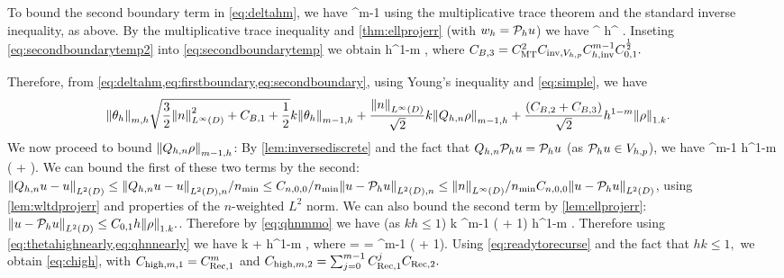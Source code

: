 To bound the second boundary term in \cref{eq:deltahm}, we have
\beq\label{eq:secondboundarytemp}
 \leq \CMT \CinvVhp \Chinv^{m-1}\NLtGI{\rho}
\eeq
using the multiplicative trace theorem and the standard inverse inequality, as above. By the multiplicative trace inequality and \cref{thm:ellprojerr} (with $w_{h} = \mathcal P_{h} u$) we have
\beq\label{eq:secondboundarytemp2}
\NLtGI{\rho} \leq \CMT {}^{\half} h^{\half} \NW{\rho}.
\eeq
Inseting \cref{eq:secondboundarytemp2} into \cref{eq:secondboundarytemp} we obtain
\beq\label{eq:secondboundary}
 \leq \CBth h^{1-m} \NW{\rho} ,
\eeq
where $C_{B,3} = C_{\mathrm{MT}}^2 C_{\mathrm{inv},V_{h,p}} C_{h,\mathrm{inv}}^{m-1}C_{0,1}^{\frac{1}{2}}.$

Therefore, from \cref{eq:deltahm,eq:firstboundary,eq:secondboundary}, using Young's inequality and \cref{eq:simple}, we have
\begin{align}\label{eq:thetahighnearly}
\Nfn{m,h}{\thetah} &\sqrt{\frac32 \NLiD{n}^2 + \CBo + \half} k  \Nfn{m-1,h}{\thetah} + \frac{\NLiD{n}}{\sqrt{2}} k \Nfn{m-1,h}{\Qhn \rho} + \frac{\mleft(\CBt + \CBth\mright)}{\sqrt{2}} h^{1-m} \NW{\rho}.
\end{align}
We now proceed to bound $\Nfn{m-1,h}{\Qhn \rho}$: By \cref{lem:inversediscrete} and the fact that $Q_{h,n} \mathcal P_{h} u = \mathcal P_{h} u$ (as $\mathcal P_{h} u \in V_{h,p}$), we have
\beq\label{eq:qhnmmo}
 \leq \Chinv^{m-1} h^{1-m} \mleft( + \mright).
\eeq
We can bound the first of these two terms by the second: $\NLtD{\Qhn u - u} \leq \NLtDn{\Qhn u - u}/\nmin \leq \Cfn{n,0,0}/\nmin \NLtDn{u - \Ph u} \leq \NLiD{n}/\nmin \Cfn{n,0,0} \NLtD{u-\Ph u}$, using \cref{lem:wltdprojerr} and properties of the $n$-weighted $L^2$ norm. We can also bound the second term by \cref{lem:ellprojerr}: $\NLtD{u - \Ph u} \leq \Cfn{0,1} h \NW{\rho}.$. Therefore by \cref{eq:qhnmmo} we have (as $kh \leq 1$)
\beq\label{eq:qhnnearly}
k  \leq \Chinv^{m-1} \mleft(  + 1\mright)  h^{1-m} \NW{\rho}.
\eeq
Therefore using \cref{eq:thetahighnearly,eq:qhnnearly} we have
\beq\label{eq:readytorecurse}
 \leq \CReco k  + \CRect h^{1-m} \NW{\rho},
\eeq
where
\beqs
\CReco =  \tand \CRect =  \Chinv^{m-1} \mleft(  + 1\mright).
\eeqs
Using \cref{eq:readytorecurse} and the fact that $hk \leq 1,$ we obtain \cref{eq:chigh}, with $C_{\mathrm{high},m,1} = C_{\mathrm{Rec},1}^m$ and $C_{\mathrm{high},m,2} = \sum_{j=0}^{m-1} C_{\mathrm{Rec},1}^j C_{\mathrm{Rec},2}.$
\epf
{}

